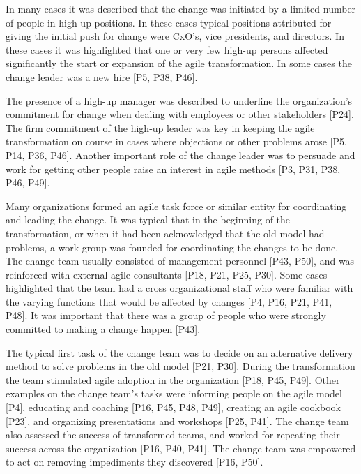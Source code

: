 
In many cases it was described that the change was initiated by a limited number
of people in high-up positions. In these cases typical positions attributed for
giving the initial push for change were CxO's, vice presidents, and directors.
In these cases it was highlighted that one or very few high-up persons affected
significantly the start or expansion of the agile transformation. In some cases
the change leader was a new hire [P5, P38, P46].

The presence of a high-up manager was described to underline the organization's
commitment for change when dealing with employees or other stakeholders [P24].
The firm commitment of the high-up leader was key in keeping the agile
transformation on course in cases where objections or other problems arose [P5,
P14, P36, P46]. Another important role of the change leader was to persuade and
work for getting other people raise an interest in agile methods [P3, P31, P38,
P46, P49].


Many organizations formed an agile task force or similar entity for coordinating
and leading the change. It was typical that in the beginning of the
transformation, or when it had been acknowledged that the old model had
problems, a work group was founded for coordinating the changes to be done. The
change team usually consisted of management personnel [P43, P50], and was
reinforced with external agile consultants [P18, P21, P25, P30]. Some cases
highlighted that the team had a cross organizational staff who were familiar
with the varying functions that would be affected by changes [P4, P16, P21, P41,
P48]. It was important that there was a group of people who were strongly
committed to making a change happen [P43].

The typical first task of the change team was to decide on an alternative
delivery method to solve problems in the old model [P21, P30]. During the
transformation the team stimulated agile adoption in the organization [P18, P45,
P49]. Other examples on the change team's tasks were informing people on the
agile model [P4], educating and coaching [P16, P45, P48, P49], creating an agile
cookbook [P23], and organizing presentations and workshops [P25, P41]. The
change team also assessed the success of transformed teams, and worked for
repeating their success across the organization [P16, P40, P41]. The change team
was empowered to act on removing impediments they discovered [P16, P50].

